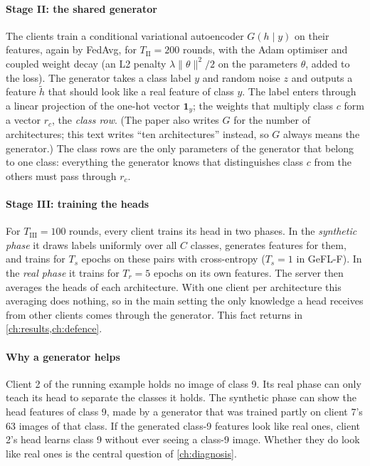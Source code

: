\paragraph{Stage II: the shared generator} The clients train a conditional variational autoencoder $G(h\mid y)$ on
their features, again by FedAvg, for $T_{\mathrm{II}}=200$ rounds, with the Adam optimiser and coupled weight decay
(an L2 penalty $\lambda\|\theta\|^2/2$ on the parameters $\theta$, added to the loss). The generator takes a class label $y$ and random noise $z$
and outputs a feature $\tilde h$ that should look like a real feature of class $y$. The label enters through a linear
projection of the one-hot vector $\mathbf 1_y$; the weights that multiply class $c$ form a vector $r_c$, the
\emph{class row}. (The paper also writes $G$ for the number of architectures; this text writes ``ten architectures''
instead, so $G$ always means the generator.)
The class rows are the only parameters of the generator that belong to one class: everything the generator knows that
distinguishes class $c$ from the others must pass through $r_c$.

\paragraph{Stage III: training the heads} For $T_{\mathrm{III}}=100$ rounds, every client trains its head in two
phases. In the \emph{synthetic phase} it draws labels uniformly over all $C$ classes, generates features for them, and
trains for $T_s$ epochs on these pairs with cross-entropy ($T_s=1$ in GeFL-F). In the \emph{real phase} it trains for
$T_r=5$ epochs on its own features. The server then averages the heads of each architecture. With one client per
architecture this averaging does nothing, so in the main setting the only knowledge a head receives from other
clients comes through the generator. This fact returns in \cref{ch:results,ch:defence}.

\paragraph{Why a generator helps} Client 2 of the running example holds no image of class 9. Its real phase can only
teach its head to separate the classes it holds. The synthetic phase can show the head features of class 9, made by a
generator that was trained partly on client 7's 63 images of that class. If the generated class-9 features look like
real ones, client 2's head learns class 9 without ever seeing a class-9 image. Whether they do look like real ones is
the central question of \cref{ch:diagnosis}.

